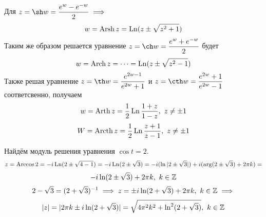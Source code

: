 \documentclass[../../main.tex]{subfiles}
\begin{document}
Для $ z = \sh w = \dfrac{e^{w} - e^{-w}}{2} \implies $
\begin{equation}
\label{lec27:29}
w = \operatorname{Arsh} z = \operatorname{Ln}(z \pm \sqrt{z^2 + 1})
\end{equation}
Таким же образом решается уравнение $ z = \ch w = \dfrac{e^{w} + 
e^{-w}}{2} $ будет 
\begin{equation}
\label{lec27:30}
w = \operatorname{Arch} z = \dots = \operatorname{Ln}(z \pm \sqrt{z^2 - 1})
\end{equation}
Также решая уравнение $ z = \th 
w = \dfrac{e^{2w - 1}}{e^{2w} + 1} $ и 
$ z = \cth w = \dfrac{e^{2w} + 1}{e^{2w} - 1} $ соответсвенно,
получаем
\begin{equation}
\label{lec27:31}
w = \operatorname{Arth} z = \dfrac{1}{2} \operatorname{Ln} \dfrac{1 + z}{1 - z},\ z \neq \pm 1
\end{equation}
\begin{equation}
\label{lec27:32}
W = \operatorname{Arcth} z = \dfrac{1}{2} \operatorname{Ln} \dfrac{z + 1}{z - 1},\
z \neq \pm 1
\end{equation}
\begin{exmp}
	Найдём модуль решения уравнения $ \cos t = 2 $.
	\[
	z = \operatorname{Arccos} 2 = -i\operatorname{Ln}(2 \pm \sqrt{4 - 1}) = 
	-i \operatorname{Ln}(2 \pm \sqrt{3}) = -i (\ln|2 \pm \sqrt{3}|) + i(\arg(2 \pm \sqrt{3}) + 
	2\pi k) = \]\[
	-i \ln(2 \pm \sqrt{3}) + 2\pi k,\ k \in \mathbb{Z}	
	\]
	\[
	2 - \sqrt{3} = (2 + \sqrt{3})^{-1} \implies
	z = \pm i \ln (2 + \sqrt{3}) + 2\pi k,\ k \in \mathbb{Z} \implies \] \[
	|z| = |2\pi k \pm i\ln(2 + \sqrt{3})| = 
	\sqrt{4\pi^2 k^2 + \ln^2(2 + \sqrt{3})},\ k \in \mathbb{Z}
	\]
\end{exmp}
\end{document}
